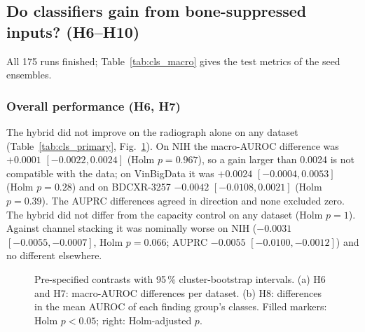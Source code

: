 \subsection{Do classifiers gain from bone-suppressed inputs? (H6--H10)}
\label{sec:cls_results}
All 175 runs finished; Table~\ref{tab:cls_macro} gives the test metrics of the seed ensembles.

\begin{table}[htbp]
\centering\small
\caption{Test macro-AUROC and macro-AUPRC of the seed ensembles (five seeds; BDCXR-3257: out-of-fold over five folds). Descriptive; the
tests are in Tables~\ref{tab:cls_primary} and~\ref{tab:cls_groups}. orig: radiograph; soft: soft-tissue image; early: three images as
channels; hybrid: three streams; ctrl: radiograph in three streams.}
\label{tab:cls_macro}
\end{table}

\subsubsection{Overall performance (H6, H7)}
The hybrid did not improve on the radiograph alone on any dataset (Table~\ref{tab:cls_primary}, Fig.~\ref{fig:cls_forest}). On NIH the
macro-AUROC difference was $+0.0001$ $[-0.0022,0.0024]$ (Holm $p=0.967$), so a gain larger than 0.0024 is not compatible with the data; on
VinBigData it was $+0.0024$ $[-0.0004,0.0053]$ (Holm $p=0.28$) and on BDCXR-3257 $-0.0042$ $[-0.0108,0.0021]$ (Holm $p=0.39$). The
AUPRC differences agreed in direction and none excluded zero. The hybrid did not differ from the capacity control on any dataset (Holm
$p=1$). Against channel stacking it was nominally worse on NIH ($-0.0031$ $[-0.0055,-0.0007]$, Holm $p=0.066$; AUPRC $-0.0055$
$[-0.0100,-0.0012]$) and no different elsewhere.

\begin{table}[htbp]
\centering\footnotesize
\caption{H6 (primary) and H7: differences of the seed ensembles with 95\,\% cluster-bootstrap intervals (\num{10000} resamples). Holm: H6
over the three datasets, H7 over its six tests.}
\label{tab:cls_primary}
\end{table}

\begin{figure}[htbp]
\centering
{}
\caption{Pre-specified contrasts with 95\,\% cluster-bootstrap intervals. (a) H6 and H7: macro-AUROC differences per dataset. (b) H8:
differences in the mean AUROC of each finding group's classes. Filled markers: Holm $p<0.05$; right: Holm-adjusted $p$.}
\label{fig:cls_forest}
\end{figure}

